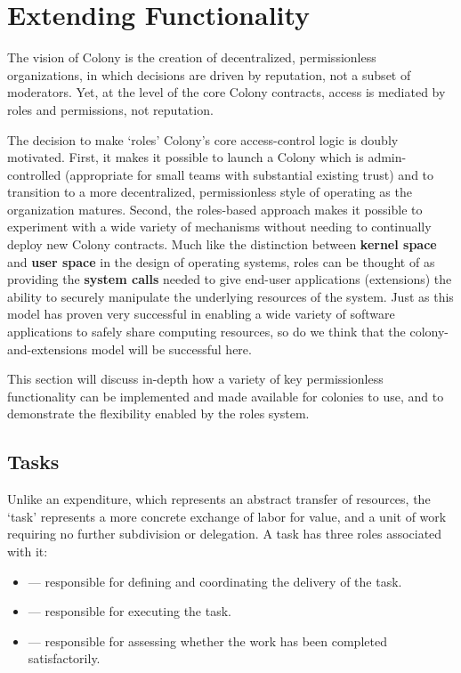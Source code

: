 \section{Extending Functionality}\label{sec:extensions}

The vision of Colony is the creation of decentralized, permissionless organizations, in which decisions are driven by reputation, not a subset of moderators. Yet, at the level of the core Colony contracts, access is mediated by roles and permissions, not reputation.

The decision to make `roles' Colony's core access-control logic is doubly motivated. First, it makes it possible to launch a Colony which is admin-controlled (appropriate for small teams with substantial existing trust) and to transition to a more decentralized, permissionless style of operating as the organization matures. Second, the roles-based approach makes it possible to experiment with a wide variety of mechanisms without needing to continually deploy new Colony contracts. Much like the distinction between \textbf{kernel space} and \textbf{user space} in the design of operating systems, roles can be thought of as providing the \textbf{system calls} needed to give end-user applications (extensions) the ability to securely manipulate the underlying resources of the system. Just as this model has proven very successful in enabling a wide variety of software applications to safely share computing resources, so do we think that the colony-and-extensions model will be successful here.

This section will discuss in-depth how a variety of key permissionless functionality can be implemented and made available for colonies to use, and to demonstrate the flexibility enabled by the roles system.

\subsection{Tasks}\label{sec:tasks}

Unlike an expenditure, which represents an abstract transfer of resources, the `task' represents a more concrete exchange of labor for value, and a unit of work requiring no further subdivision or delegation. A task has three roles associated with it:

\begin{itemize}
\item {} --- responsible for defining and coordinating the delivery of the task.
\item {} --- responsible for executing the task.
\item {} --- responsible for assessing whether the work has been completed satisfactorily.
\end{itemize}

